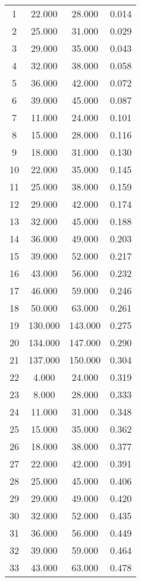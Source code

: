% 
\begin{tabular}{cccc}
  \hline
  \hline
1 & 22.000 & 28.000 & 0.014 \\ 
  2 & 25.000 & 31.000 & 0.029 \\ 
  3 & 29.000 & 35.000 & 0.043 \\ 
  4 & 32.000 & 38.000 & 0.058 \\ 
  5 & 36.000 & 42.000 & 0.072 \\ 
  6 & 39.000 & 45.000 & 0.087 \\ 
  7 & 11.000 & 24.000 & 0.101 \\ 
  8 & 15.000 & 28.000 & 0.116 \\ 
  9 & 18.000 & 31.000 & 0.130 \\ 
  10 & 22.000 & 35.000 & 0.145 \\ 
  11 & 25.000 & 38.000 & 0.159 \\ 
  12 & 29.000 & 42.000 & 0.174 \\ 
  13 & 32.000 & 45.000 & 0.188 \\ 
  14 & 36.000 & 49.000 & 0.203 \\ 
  15 & 39.000 & 52.000 & 0.217 \\ 
  16 & 43.000 & 56.000 & 0.232 \\ 
  17 & 46.000 & 59.000 & 0.246 \\ 
  18 & 50.000 & 63.000 & 0.261 \\ 
  19 & 130.000 & 143.000 & 0.275 \\ 
  20 & 134.000 & 147.000 & 0.290 \\ 
  21 & 137.000 & 150.000 & 0.304 \\ 
  22 & 4.000 & 24.000 & 0.319 \\ 
  23 & 8.000 & 28.000 & 0.333 \\ 
  24 & 11.000 & 31.000 & 0.348 \\ 
  25 & 15.000 & 35.000 & 0.362 \\ 
  26 & 18.000 & 38.000 & 0.377 \\ 
  27 & 22.000 & 42.000 & 0.391 \\ 
  28 & 25.000 & 45.000 & 0.406 \\ 
  29 & 29.000 & 49.000 & 0.420 \\ 
  30 & 32.000 & 52.000 & 0.435 \\ 
  31 & 36.000 & 56.000 & 0.449 \\ 
  32 & 39.000 & 59.000 & 0.464 \\ 
  33 & 43.000 & 63.000 & 0.478 \\ 

\end{tabular}
